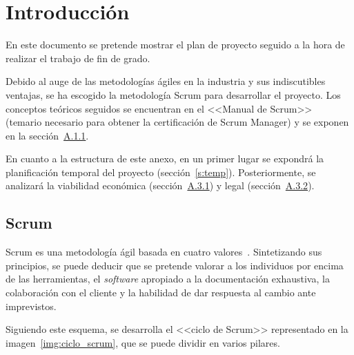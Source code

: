 
\section{Introducción}

En este documento se pretende mostrar el plan de proyecto seguido a la hora de realizar el trabajo de fin de grado.

Debido al auge de las metodologías ágiles en la industria y sus indiscutibles ventajas, se ha escogido la metodología Scrum para desarrollar el proyecto. Los conceptos teóricos seguidos se encuentran en el <<Manual de Scrum>>~\cite{scrumMaster2022} (temario necesario para obtener la certificación de Scrum Manager) y se exponen en la sección~\hyperref[s:scrum]{A.1.1}.

En cuanto a la estructura de este anexo, en un primer lugar se expondrá la planificación temporal del proyecto (sección~\ref{s:temp}). Posteriormente, se analizará la viabilidad económica (sección~\hyperref[s:ve]{A.3.1}) y legal (sección~\hyperref[s:vl]{A.3.2}).

\subsection{Scrum}
\label{s:scrum}
Scrum es una metodología ágil basada en cuatro valores~\cite{scrumMaster2022}. Sintetizando sus principios, se puede deducir que se pretende valorar a los individuos por encima de las herramientas, el \textit{software} apropiado a la documentación exhaustiva, la colaboración con el cliente y la habilidad de dar respuesta al cambio ante imprevistos.

Siguiendo este esquema, se desarrolla el <<ciclo de Scrum>> representado en la imagen~\ref{img:ciclo_scrum}, que se puede dividir en varios pilares.


